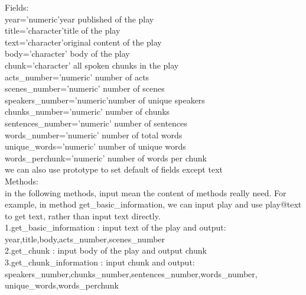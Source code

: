 \documentclass{article}\usepackage[]{graphicx}\usepackage[]{color}
\begin{document}
Fields:\\
\quad year='numeric'\qquad year published of the play\\
\quad title='character'\qquad title of the play\\
\quad text='character'\qquad original content of the play\\
\quad body='character' \qquad body of the play\\
\quad chunk='character' \qquad all spoken chunks in the play\\
\quad acts\_number='numeric' \qquad number of acts\\
\quad scenes\_number='numeric' \qquad number of scenes\\
\quad speakers\_number='numeric'\qquad number of unique speakers\\
\quad chunks\_number='numeric' \qquad number of chunks\\
\quad sentences\_number='numeric' \qquad number of sentences\\
\quad words\_number='numeric' \qquad number of total words\\
\quad unique\_words='numeric' \qquad number of unique words\\
\quad words\_perchunk='numeric' \qquad number of words per chunk\\
we can also use prototype to set default of fields except text\\


Methods:\\
in the following methods, input mean the content of methods really need. For example, in method get\_basic\_information, we can input play and use play@text to get text, rather than input text directly.
\\
1.get\_basic\_information : input text of the play and output: year,title,body,acts\_number,scenes\_number \\  
2.get\_chunk : input body of the play and output chunk \\
3.get\_chunk\_information : input chunk and output: speakers\_number,chunks\_number,sentences\_number,words\_number,\\unique\_words,words\_perchunk
  
\end{document}
